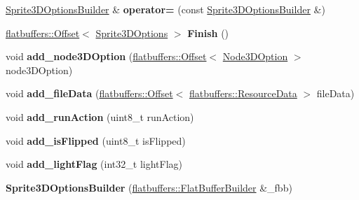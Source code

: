 \begin{DoxyCompactItemize}
\hyperlink{structflatbuffers_1_1Sprite3DOptionsBuilder}{Sprite3\+D\+Options\+Builder} \& {\bfseries operator=} (const \hyperlink{structflatbuffers_1_1Sprite3DOptionsBuilder}{Sprite3\+D\+Options\+Builder} \&)
\item 
\mbox{\label{structflatbuffers_1_1Sprite3DOptionsBuilder_a933389d01d852198c31c5ebe0ed0a443}} 
\hyperlink{structflatbuffers_1_1Offset}{flatbuffers\+::\+Offset}$<$ \hyperlink{structflatbuffers_1_1Sprite3DOptions}{Sprite3\+D\+Options} $>$ {\bfseries Finish} ()
\item 
\mbox{\label{structflatbuffers_1_1Sprite3DOptionsBuilder_a4acd540761b4731950f4e24fb0a634c7}} 
void {\bfseries add\+\_\+node3\+D\+Option} (\hyperlink{structflatbuffers_1_1Offset}{flatbuffers\+::\+Offset}$<$ \hyperlink{structflatbuffers_1_1Node3DOption}{Node3\+D\+Option} $>$ node3\+D\+Option)
\item 
\mbox{\label{structflatbuffers_1_1Sprite3DOptionsBuilder_a9ba2cfa1ac7411fd3ec154bef46b816f}} 
void {\bfseries add\+\_\+file\+Data} (\hyperlink{structflatbuffers_1_1Offset}{flatbuffers\+::\+Offset}$<$ \hyperlink{structflatbuffers_1_1ResourceData}{flatbuffers\+::\+Resource\+Data} $>$ file\+Data)
\item 
\mbox{\label{structflatbuffers_1_1Sprite3DOptionsBuilder_a7127429580634dd3511e4075cab148e0}} 
void {\bfseries add\+\_\+run\+Action} (uint8\+\_\+t run\+Action)
\item 
\mbox{\label{structflatbuffers_1_1Sprite3DOptionsBuilder_a2f37d18d37d2f574f33e2c189e9e294e}} 
void {\bfseries add\+\_\+is\+Flipped} (uint8\+\_\+t is\+Flipped)
\item 
\mbox{\label{structflatbuffers_1_1Sprite3DOptionsBuilder_a3260c5ea40d28bc2e3ce8bdb63ea821e}} 
void {\bfseries add\+\_\+light\+Flag} (int32\+\_\+t light\+Flag)
\item 
\mbox{\label{structflatbuffers_1_1Sprite3DOptionsBuilder_af546810cabbde1082a2d323b625a9d52}} 
{\bfseries Sprite3\+D\+Options\+Builder} (\hyperlink{classflatbuffers_1_1FlatBufferBuilder}{flatbuffers\+::\+Flat\+Buffer\+Builder} \&\+\_\+fbb)

\end{DoxyCompactItemize}
